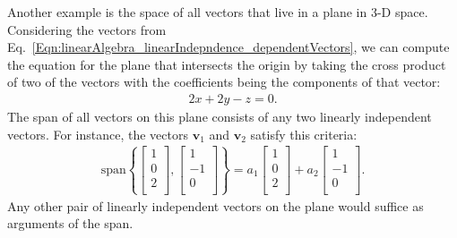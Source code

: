 Another example is the space of all vectors that live in a plane in 3-D space. Considering the vectors from Eq.~\eqref{Eqn:linearAlgebra_linearIndepndence_dependentVectors}, we can compute the equation for the plane that intersects the origin by taking the cross product of two of the vectors with the coefficients being the components of that vector:
\begin{align}
  2x + 2y - z = 0. \nonumber
\end{align}
The span of all vectors on this plane consists of any two linearly independent vectors. For instance, the vectors $\mathbf{v}_1$ and $\mathbf{v}_2$ satisfy this criteria:
\begin{align}
  \text{span} \left\{ 
    \left[ \begin{array}{c} 1 \\  0 \\ 2 \\ \end{array} \right] ,
    \left[ \begin{array}{c} 1 \\ -1 \\ 0 \\ \end{array} \right] \right\}
  = a_1 \left[ \begin{array}{c} 1 \\  0 \\ 2 \\ \end{array} \right] 
  + a_2 \left[ \begin{array}{c} 1 \\ -1 \\ 0 \\  \end{array} \right] .
\end{align}
Any other pair of linearly independent vectors on the plane would suffice as arguments of the span.

